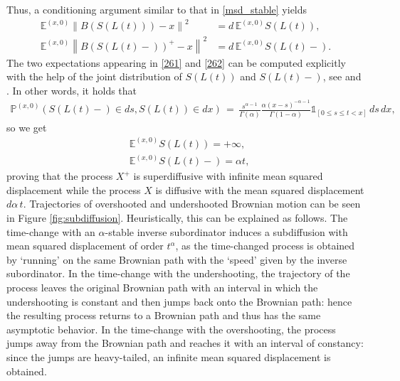 \documentclass[reqno]{amsart}
\theoremstyle{remark}
\numberwithin{equation}{section} %
\newcommand{\1}{\mathds{1}}
\begin{document}
	Thus, a conditioning argument similar to that in \eqref{msd_stable} yields
	\begin{align}
		\mathds{E}^{(x,0)} \left\| B(S(L(t)))-x \right\|^2  &=  d\, \mathds{E}^{(x,0)} S(L(t)), \label{261}\\
		\mathds{E}^{(x,0)} \left\| B(S(L(t)-))^+-x \right\|^2  &    = d\, \mathds{E}^{(x,0)} S(L(t)-).
		\label{262}
	\end{align}
	The two expectations appearing in \eqref{261} and \eqref{262} can be computed explicitly with the help of the joint distribution of $S(L(t))$ and $S(L(t)-)$, see \cite[page 96]{bogdan2009potential} and \cite[Example 5.8]{bogdan2009potential}. In other words, it holds that
	\begin{align*}
		\mathds{P}^{(x,0)} (S(L(t)-) \in ds, S(L(t)) \in dx) \, = \, \frac{s^{\alpha -1}}{\Gamma(\alpha)} \frac{\alpha (x-s)^{-\alpha-1}}{\Gamma (1-\alpha)} \mathds{1}_{[0\le s\le t<x]} \, ds \, dx,
	\end{align*}
	so we get
	\begin{align}
		&  \mathds{E}^{(x,0)} S(L(t))  = +\infty, \\
		& \mathds{E}^{(x,0)} S(L(t)-) = \alpha t,
	\end{align}
	proving that the process $X^+$ is superdiffusive with infinite mean squared displacement while the process $X$ is diffusive with the mean squared displacement $d\alpha\,t$. Trajectories of overshooted and undershooted Brownian motion can be seen in Figure \ref{fig:subdiffusion}.
	Heuristically, this can be explained as follows. The time-change with an $\alpha$-stable inverse subordinator induces a subdiffusion with mean squared displacement of order $t^\alpha$, as the time-changed process is obtained by `running' on the same Brownian path with the `speed' given by the inverse subordinator. In the time-change with the undershooting, the trajectory of the process leaves the original Brownian path with an interval in which the undershooting is constant and then jumps back onto the Brownian path: hence the resulting process returns to a Brownian path and thus has the same asymptotic behavior. In the time-change with the overshooting, the process jumps away from the Brownian path and reaches it with an interval of constancy: since the jumps are heavy-tailed, an infinite mean squared displacement is obtained.
	
\end{document}
